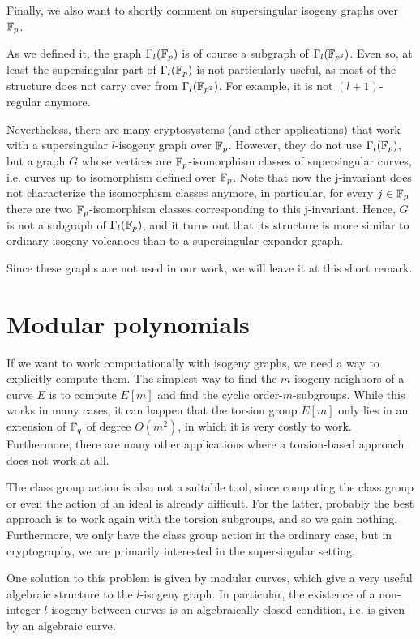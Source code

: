 Finally, we also want to shortly comment on supersingular isogeny graphs over $\mathbb{F}_p$.
\begin{remark}
    As we defined it, the graph $\Gamma_l(\mathbb{F}_p)$ is of course a subgraph of $\Gamma_l(\mathbb{F}_{p^2})$.
    Even so, at least the supersingular part of $\Gamma_l(\mathbb{F}_p)$ is not particularly useful, as most of the structure does not carry over from $\Gamma_l(\mathbb{F}_{p^2})$.
    For example, it is not $(l + 1)$-regular anymore.

    Nevertheless, there are many cryptosystems (and other applications) that work with a supersingular $l$-isogeny graph over $\mathbb{F}_p$.
    However, they do not use $\Gamma_l(\mathbb{F}_p)$, but a graph $G$ whose vertices are $\mathbb{F}_p$-isomorphism classes of supersingular curves, i.e. curves up to isomorphism defined over $\mathbb{F}_p$.
    Note that now the j-invariant does not characterize the isomorphism classes anymore, in particular, for every $j \in \mathbb{F}_p$ there are two $\mathbb{F}_p$-isomorphism classes corresponding to this j-invariant.
    Hence, $G$ is not a subgraph of $\Gamma_l(\mathbb{F}_p)$, and it turns out that its structure is more similar to ordinary isogeny volcanoes than to a supersingular expander graph.
\end{remark}
Since these graphs are not used in our work, we will leave it at this short remark.

\section{Modular polynomials}
If we want to work computationally with isogeny graphs, we need a way to explicitly compute them.
The simplest way to find the $m$-isogeny neighbors of a curve $E$ is to compute $E[m]$ and find the cyclic order-$m$-subgroups.
While this works in many cases, it can happen that the torsion group $E[m]$ only lies in an extension of $\mathbb{F}_q$ of degree $O(m^2)$, in which it is very costly to work.
Furthermore, there are many other applications where a torsion-based approach does not work at all.

The class group action is also not a suitable tool, since computing the class group or even the action of an ideal is already difficult.
For the latter, probably the best approach is to work again with the torsion subgroups, and so we gain nothing.
Furthermore, we only have the class group action in the ordinary case, but in cryptography, we are primarily interested in the supersingular setting.

One solution to this problem is given by modular curves, which give a very useful algebraic structure to the $l$-isogeny graph.
In particular, the existence of a non-integer $l$-isogeny between curves is an algebraically closed condition, i.e. is given by an algebraic curve.


